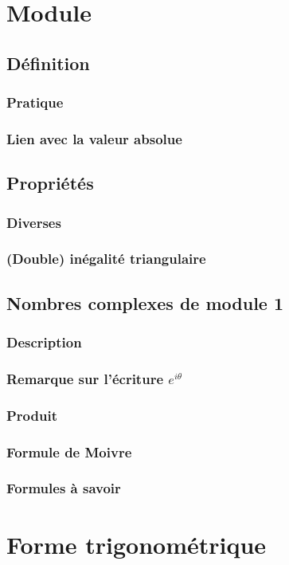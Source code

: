 \documentclass[12pt,a4paper,french]{book}
\begin{document}
	\section{Module}
		\subsection{Définition}
			\subsubsection{Pratique}
			\subsubsection{Lien avec la valeur absolue}
		\subsection{Propriétés}
			\subsubsection{Diverses}
			\subsubsection{(Double) inégalité triangulaire}
		\subsection{Nombres complexes de module 1}
			\subsubsection{Description}
			\subsubsection{Remarque sur l'écriture $e^{i\theta}$}
			\subsubsection{Produit}
			\subsubsection{Formule de Moivre}
			\subsubsection{Formules à savoir}
	\section{Forme trigonométrique}
\end{document}
